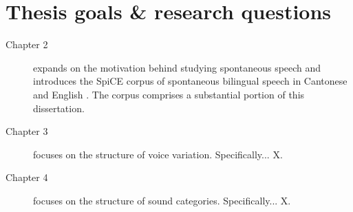 
\section{Thesis goals \& research questions}\label{ch1:sec:goals}
\begin{description}
    \item[Chapter 2] expands on the motivation behind studying spontaneous speech and introduces the SpiCE corpus of spontaneous bilingual speech in Cantonese and English \citep{johnson_2021_spice}. The corpus comprises a substantial portion of this dissertation.
    \item[Chapter 3] focuses on the structure of voice variation. Specifically... X.
    \item[Chapter 4] focuses on the structure of sound categories. Specifically... X.
\end{description}

\endinput %
